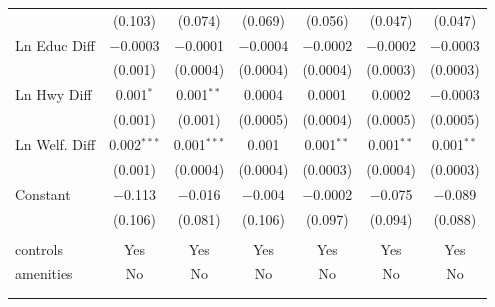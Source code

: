 \begin{table}[!htbp]
\begin{tabular}{@{\extracolsep{5pt}}lcccccc}
  & (0.103) & (0.074) & (0.069) & (0.056) & (0.047) & (0.047) \\ 
  Ln Educ Diff & $-$0.0003 & $-$0.0001 & $-$0.0004 & $-$0.0002 & $-$0.0002 & $-$0.0003 \\ 
  & (0.001) & (0.0004) & (0.0004) & (0.0004) & (0.0003) & (0.0003) \\ 
  Ln Hwy Diff & 0.001$^{*}$ & 0.001$^{**}$ & 0.0004 & 0.0001 & 0.0002 & $-$0.0003 \\ 
  & (0.001) & (0.001) & (0.0005) & (0.0004) & (0.0005) & (0.0005) \\ 
  Ln Welf. Diff & 0.002$^{***}$ & 0.001$^{***}$ & 0.001 & 0.001$^{**}$ & 0.001$^{**}$ & 0.001$^{**}$ \\ 
  & (0.001) & (0.0004) & (0.0004) & (0.0003) & (0.0004) & (0.0003) \\ 
  Constant & $-$0.113 & $-$0.016 & $-$0.004 & $-$0.0002 & $-$0.075 & $-$0.089 \\ 
  & (0.106) & (0.081) & (0.106) & (0.097) & (0.094) & (0.088) \\ 
 \hline \\[-1.8ex] 
controls & Yes & Yes & Yes & Yes & Yes & Yes \\ 
amenities & No & No & No & No & No & No \\ 
\hline \\[-1.8ex] 
\hline 
\hline \\[-1.8ex] 
\end{tabular} 
\end{table} 
